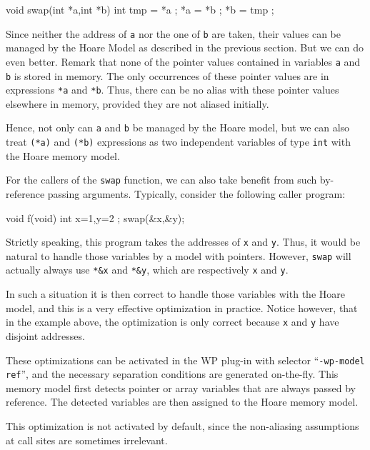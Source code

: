 \begin{ccode}
void swap(int *a,int *b)
{
  int tmp = *a ;
  *a = *b ;
  *b = tmp ;
}
\end{ccode}

Since neither the address of \lstinline{a} nor the one of \lstinline{b}
are taken, their values can be managed by the Hoare Model as described
in the previous section. But we can do even better. Remark that none of
the pointer values contained in variables \lstinline{a} and
\lstinline{b} is stored in memory. The only occurrences of these
pointer values are in expressions \lstinline{*a} and
\lstinline{*b}. Thus, there can be no alias with these pointer values
elsewhere in memory, provided they are not aliased initially.

Hence, not only can \lstinline{a} and \lstinline{b} be managed by the
Hoare model, but we can also treat \lstinline{(*a)} and \lstinline{(*b)}
expressions as two independent variables of type \lstinline{int} with
the Hoare memory model.

For the callers of the \lstinline{swap} function, we can also take benefit
from such by-reference passing arguments. Typically, consider the
following caller program:

\begin{ccode}
void f(void)
{
  int x=1,y=2 ;
  swap(&x,&y);
}
\end{ccode}

Strictly speaking, this program takes the addresses of \lstinline{x}
and \lstinline{y}. Thus, it would be natural to handle those variables
by a model with pointers. However, \lstinline{swap} will actually
always use \lstinline{*&x} and \lstinline{*&y}, which are respectively
\lstinline{x} and \lstinline{y}.

In such a situation it is then correct to handle those variables
with the Hoare model, and this is a very effective optimization in
practice. Notice however, that in the example above, the optimization
is only correct because \lstinline{x} and \lstinline{y} have disjoint
addresses.

These optimizations can be activated in the \textsf{WP} plug-in with
selector ``\texttt{-wp-model ref}'', and the necessary separation
conditions are generated on-the-fly. This memory model first detects
pointer or array variables that are always passed by reference. The
detected variables are then assigned to the Hoare memory model.

This optimization is not activated by default, since the non-aliasing
assumptions at call sites are sometimes irrelevant.


